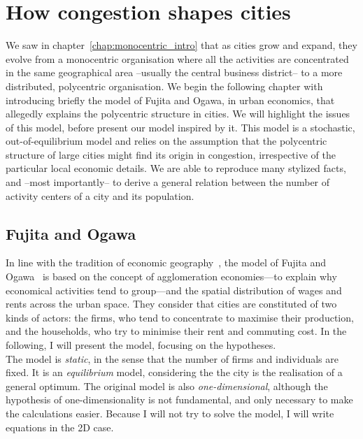 \chapter{How congestion shapes cities}
\label{chap:monocentric_model}

We saw in chapter~\ref{chap:monocentric_intro} that as cities grow and expand,
they evolve from a monocentric organisation where all the activities are
concentrated in the same geographical area --usually the central business
district-- to a more distributed, polycentric organisation. We begin the
following chapter with introducing briefly the model of Fujita and Ogawa, in
urban economics, that allegedly explains the polycentric structure in cities. We
will highlight the issues of this model, before present our model inspired by
it. This model is a stochastic, out-of-equilibrium model and relies on the
assumption that the polycentric structure of large cities might find its origin
in congestion, irrespective of the particular local economic details. We are
able to reproduce many stylized facts, and --most importantly-- to derive a
general relation between the number of activity centers of a city and its
population. 


\section{Fujita and Ogawa}
\label{sec:fujita_and_ogawa}

In line with the tradition of economic geography~\cite{Fujita:2001}, the model
of Fujita and Ogawa~\cite{Fujita:1982} is based on the concept of agglomeration
economies---to explain why economical activities tend to group---and the spatial
distribution of wages and rents across the urban space. They consider that
cities are constituted of two kinds of actors: the firms, who tend to
concentrate to maximise their production, and the households, who try to
minimise their rent and commuting cost. In the following, I will present the
model, focusing on the hypotheses.\\ 

The model is \emph{static}, in the sense that the number of firms and
individuals are fixed. It is an \emph{equilibrium} model, considering the the
city is the realisation of a general optimum. The original model is also
\emph{one-dimensional}, although the hypothesis of one-dimensionality is not
fundamental, and only necessary to make the calculations easier. Because I will
not try to solve the model, I will write equations in the 2D case.


